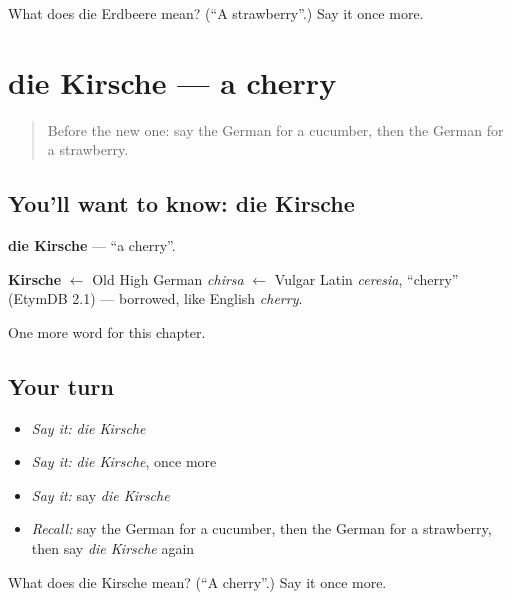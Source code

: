 \begin{tcolorbox}[breakable,colback=teal!4,colframe=teal!35!black,title={Before you move on}]
What does die Erdbeere mean? (\textquotedblleft{}A strawberry\textquotedblright{}.) Say it once more.
\end{tcolorbox}
\section[die Kirsche]{die Kirsche — a cherry}

\label{lesson:GE-C121-kirsche}



\begin{quote}
Before the new one: say the German for a cucumber, then the German for a strawberry.
\end{quote}

\subsection*{You'll want to know: die Kirsche}
\textbf{die Kirsche} — \textquotedblleft{}a cherry\textquotedblright{}.

\begin{cousinweb}
\textbf{Kirsche} $\leftarrow$ Old High German \emph{chirsa} $\leftarrow$ Vulgar Latin \emph{ceresia}, \textquotedblleft{}cherry\textquotedblright{} (EtymDB 2.1) — borrowed, like English \emph{cherry}.
\end{cousinweb}

\begin{grammarlens}[title={What you've built}]
One more word for this chapter.
\end{grammarlens}

\subsection*{Your turn}
\begin{itemize}
\raggedright
  \item \emph{Say it:} \emph{die Kirsche}
  \item \emph{Say it:} \emph{die Kirsche}, once more
  \item \emph{Say it:} say \emph{die Kirsche}
  \item \emph{Recall:} say the German for a cucumber, then the German for a strawberry, then say \emph{die Kirsche} again
\end{itemize}

\begin{tcolorbox}[breakable,colback=teal!4,colframe=teal!35!black,title={Before you move on}]
What does die Kirsche mean? (\textquotedblleft{}A cherry\textquotedblright{}.) Say it once more.
\end{tcolorbox}
